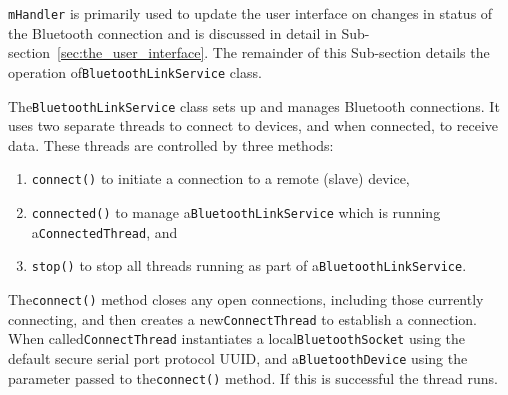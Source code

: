 \documentclass[11pt, a4paper, oneside, english]{scrbook}
\begin{document}
\lstinline{mHandler} is primarily used to update the user interface on changes in status of the Bluetooth connection and is discussed in detail in Sub-section~\ref{sec:the_user_interface}. The remainder of this Sub-section details the operation of\lstinline{BluetoothLinkService} class.

The\lstinline{BluetoothLinkService} class sets up and manages Bluetooth connections. It uses two separate threads to connect to devices, and when connected, to receive data. These threads are controlled by three methods:
\begin{enumerate}
\item\lstinline{connect()} to initiate a connection to a remote (slave) device,
\item\lstinline{connected()} to manage a\lstinline{BluetoothLinkService} which is running a\lstinline{ConnectedThread}, and
\item\lstinline{stop()} to stop all threads running as part of a\lstinline{BluetoothLinkService}.
\end{enumerate}
The\lstinline{connect()} method closes any open connections, including those currently connecting, and then creates a new\lstinline{ConnectThread} to establish a connection. When called\lstinline{ConnectThread} instantiates a local\lstinline{BluetoothSocket} using the default secure serial port protocol UUID, and a\lstinline{BluetoothDevice} using the parameter passed to the\lstinline{connect()} method. If this is successful the thread runs.
\end{document}
